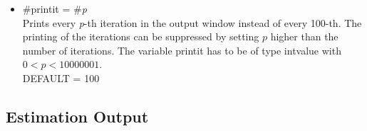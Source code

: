 \begin{itemize}
    {\tt print\_models = prob} the most frequent models which unify 1-a  of the posterior
    probability are printed. The variable alpha has to be of type intvalue with $a \in [0,1]$. \\
    DEFAULT = 0.05
\item #printit = #{\em p} \\
    Prints every {\em p}-th iteration in the output window instead of every 100-th. The printing of the
    iterations can be suppressed by setting $p$ higher than the number of iterations. The variable printit has to be of
    type intvalue with $0 < p< 10000001$. \\
    DEFAULT = 100
\end{itemize}



\subsection{Estimation Output}

